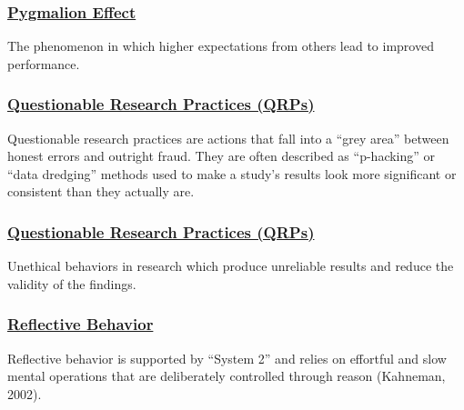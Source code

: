 \documentclass[
  letterpaper,
]{book}
\begin{document}
\subsubsection*{\texorpdfstring{\hyperref[def-pygmalioneffect]{Pygmalion
Effect}}{Pygmalion Effect}}\label{pygmalion-effect-1}

The phenomenon in which higher expectations from others lead to improved
performance.

\subsubsection*{\texorpdfstring{\hyperref[def-qrps]{Questionable
Research Practices
(QRPs)}}{Questionable Research Practices (QRPs)}}\label{questionable-research-practices-qrps}

Questionable research practices are actions that fall into a ``grey
area'' between honest errors and outright fraud. They are often
described as ``p-hacking'' or ``data dredging'' methods used to make a
study's results look more significant or consistent than they actually
are.

\subsubsection*{\texorpdfstring{\hyperref[def-questionableresearchpractices]{Questionable
Research Practices
(QRPs)}}{Questionable Research Practices (QRPs)}}\label{questionable-research-practices-qrps-1}

Unethical behaviors in research which produce unreliable results and
reduce the validity of the findings.

\subsubsection*{\texorpdfstring{\hyperref[def-reflectivebehavior]{Reflective
Behavior}}{Reflective Behavior}}\label{reflective-behavior}

Reflective behavior is supported by ``System 2'' and relies on effortful
and slow mental operations that are deliberately controlled through
reason (Kahneman, 2002).
\end{document}
